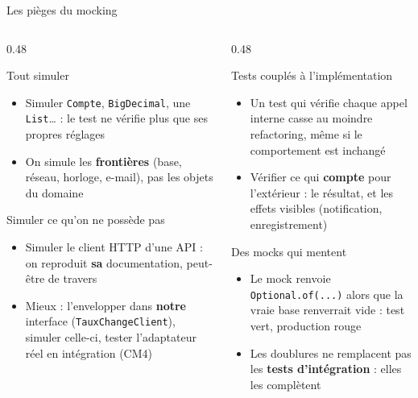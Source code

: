 \documentclass[aspectratio=169,10pt]{beamer}
\begin{document}
\begin{frame}{Les pièges du mocking}
  \footnotesize
  \begin{columns}[T]
    \begin{column}{0.48\textwidth}
      \begin{alertblock}{Tout simuler}
        \begin{itemize}
          \item Simuler \texttt{Compte}, \texttt{BigDecimal}, une \texttt{List}\ldots{} : le test ne vérifie plus que ses propres réglages
          \item On simule les \textbf{frontières} (base, réseau, horloge, e-mail), pas les objets du domaine
        \end{itemize}
      \end{alertblock}
      \begin{alertblock}{Simuler ce qu'on ne possède pas}
        \begin{itemize}
          \item Simuler le client HTTP d'une API : on reproduit \textbf{sa} documentation, peut-être de travers
          \item Mieux : l'envelopper dans \textbf{notre} interface (\texttt{TauxChangeClient}), simuler celle-ci, tester l'adaptateur réel en intégration (CM4)
        \end{itemize}
      \end{alertblock}
    \end{column}
    \begin{column}{0.48\textwidth}
      \begin{alertblock}{Tests couplés à l'implémentation}
        \begin{itemize}
          \item Un test qui vérifie chaque appel interne casse au moindre refactoring, même si le comportement est inchangé
          \item Vérifier ce qui \textbf{compte} pour l'extérieur : le résultat, et les effets visibles (notification, enregistrement)
        \end{itemize}
      \end{alertblock}
      \begin{alertblock}{Des mocks qui mentent}
        \begin{itemize}
          \item Le mock renvoie \texttt{Optional.of(...)} alors que la vraie base renverrait vide : test vert, production rouge
          \item Les doublures ne remplacent pas les \textbf{tests d'intégration} : elles les complètent
        \end{itemize}
      \end{alertblock}
    \end{column}
  \end{columns}
\end{frame}
\end{document}
